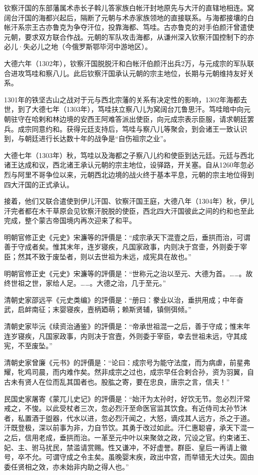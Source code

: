 钦察汗国的东部藩属术赤长子斡儿答家族白帐汗封地原先与大汗的直辖地相连。窝阔台汗国的海都兴起后，隔断了元朝与术赤家族领地的直接联系。与海都接壤的白帐汗系宗王古亦鲁克为争夺汗位，投靠海都、笃哇。古亦鲁克的对手伯颜汗曾遣使元朝，要求双方联合作战。元朝的军队攻击海都，从谦州深入钦察汗国控制下的亦必儿·失必儿之地（今俄罗斯鄂毕河中游地区）。

大德六年（1302年），钦察汗国脱脱汗和白帐汗伯颜汗出兵2万，与元成宗的军队联合进攻笃哇和察八儿。此后钦察汗国承认元朝的宗主地位，长期与元朝维持友好关系。

1301年的铁坚古山之战对于元与西北宗藩的关系有决定性的影响，1302年海都去世，到了大德七年（1303年），笃哇扶立察八儿为窝阔台兀鲁思汗。笃哇暗中向元朝驻守在哈剌和林边境的安西王阿难答派出使臣，向元成宗表示臣服，请求朝廷罢兵。成宗同意约和。获得元廷支持后，笃哇与察八儿等聚会，到会诸王一致认识到，与朝廷进行长达数十年的战争是“自伤祖宗之业”。

大德七年（1303年）秋，笃哇以及海都之子察八儿约和使臣到达元廷。元廷与西北诸王达成和议，西北诸王承认元朝的宗主地位，设驿路，开关塞。自从1260年忽必烈与阿里不哥争位以来，元朝西北边境的战火终于基本平息，元朝的宗主地位得到四大汗国的正式承认。

接着，他们又联合遣使到伊儿汗国、钦察汗国王庭，大德八年（1304年）秋，伊儿汗完者都在木干草原会见钦察汗脱脱的使臣，西北四大汗国彼此之间的约和也至此完成，整个蒙古帝国境内再次迎来了和平。

明朝官修正史《元史》宋濂等的評價是：“成宗承天下混壹之后，垂拱而治，可谓善于守成者矣。惟其末年，连岁寝疾，凡国家政事，内则决于宫壸，外则委于宰臣；然其不致于废坠者，则以去世祖为未远，成宪具在故也。”

明朝官修正史《元史》宋濂等的評價是：“世称元之治以至元、大德为首。……。故终世祖之世，家给人足。……。大德之治，几于至元。”

清朝史家邵远平《元史类编》的評價是：“册曰：豢业以治，垂拱用成；中年奋武，启衅南征；末婴寝疾，壼柄廼萌；赖斯贤辅，镇侧弭倾。”

清朝史家毕沅《续资治通鉴》的評價是：“帝承世祖混一之后，善于守成；惟末年连岁寝疾，凡国家政事，内则决于宫壼，外则委于宰臣，幸去世祖未远，守其成宪，不至废坠。”

清朝史家曾廉《元书》的評價是：“论曰：成宗号为能守法度，而为病虐，前星弗耀，牝鸡司晨，而内难作矣。然非成宗之过也，成宗早任合剌合孙，资为羽翼，自古未有贤人在位而乱其国者也。股肱之寄，要在忠良，唐宗之言，信夫！”

民国史家屠寄《蒙兀儿史记》的評價是：“始汗为太孙时，好饮无节。忽必烈汗常戒之，不悛。以此受杖者三次，忽必烈汗至命医官监其饮食。有近侍司太孙节沐者，私置酒于盥器，代水以进，忽必烈汗闻之，大怒，谪戍其人远方，杀之于道。汗既登极，深以前事为非，力自节饮。其勇于改过如此。汗仁惠聪睿，承天下混一之后，信用老成，垂拱而治。一革至元中叶以来聚敛之政，冗设之官。约束诸王、妃、主、驸马扰民，禁滥请赏赐。性又谦冲，不好虚誉。群臣、皇后一再请上徽号，卒不允。可谓守成之令主矣。虽晚婴末疾，政出中宫，而举错无大过失。固由委任贤相之效，亦未始非内助之得人也。”

